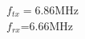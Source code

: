 \documentclass[preview]{standalone}
\begin{document}
\begin{center}
$f_{tx}=$6.86MHz\\$f_{rx}$=6.66MHz
\end{center}
\end{document}
